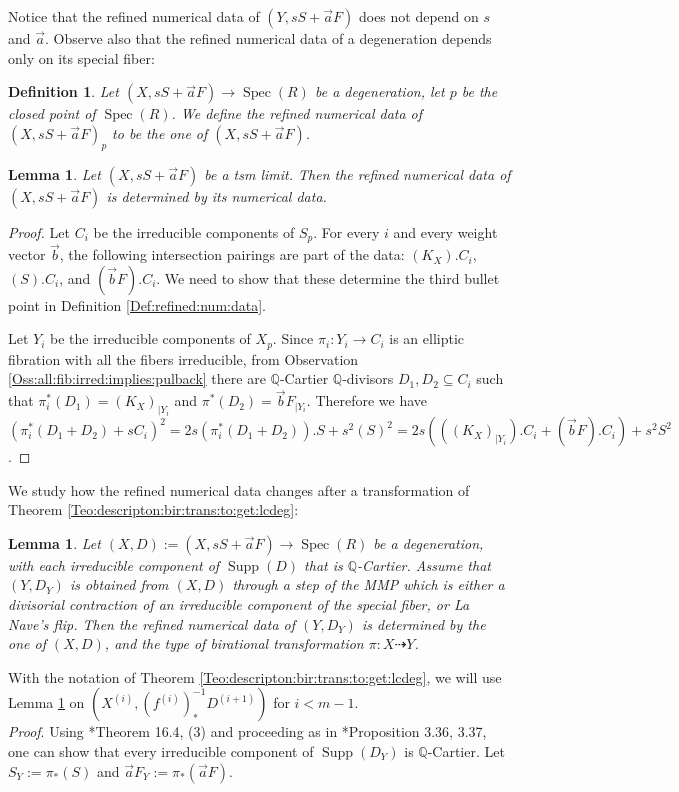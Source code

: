 \documentclass[11pt]{amsart}
\newcommand{\spec}{\operatorname{Spec}}
\newcommand{\supp}{\operatorname{Supp}}
\newtheorem{Def}[theorem]{Definition}
\newtheorem{Lemma}[theorem]{Lemma}
\theoremstyle{definition}
\begin{document}
Notice that the refined numerical data of $(Y,sS+\vec{a}F)$ does not depend on $s$ and $\vec{a}$. 
 Observe also that
the refined numerical data of a degeneration depends only on its special fiber:
\begin{Def}\label{Def:num:data:special:fiber}
 Let $(X,sS+\vec{a}F) \to \spec(R)$ be a degeneration, let $p$ be the closed point of $\spec(R)$.
 We define the refined numerical
 data of $(X,sS+\vec{a}F)_p$ to be the one of $(X,sS+\vec{a}F)$.
\end{Def}
\begin{Lemma}\label{Lemma:numerical:data:gives:rnum:data} Let $(X,sS+\vec{a}F)$ be a tsm limit. Then the refined numerical data of $(X,sS+\vec{a}F)$
is determined by its numerical data. \end{Lemma}
\begin{proof} Let $C_i$ be the irreducible components of $S_p$.
For every $i$ and every weight vector $\vec{b}$, the following intersection pairings are part of the data:
 $(K_{X}).C_i$,
  $(S).C_i$, and
  $(\vec{b}F).C_i$. We need to show that these determine the third bullet point in Definition \ref{Def:refined:num:data}.

Let $Y_i$ be the irreducible components of $X_p$.
Since $\pi_i:Y_i \to C_i$ is an
elliptic fibration with all the fibers irreducible, from Observation \ref{Oss:all:fib:irred:implies:pulback} there are $\mathbb{Q}$-Cartier $\mathbb{Q}$-divisors $D_1,D_2 \subseteq C_i$ such that
$\pi_i^*(D_1)=(K_{X})_{|Y_i}$ and $\pi^*(D_2)=\vec{b}F_{|Y_i}$.
Therefore we have $(\pi_i^*(D_1+D_2)+sC_i)^2=2s(\pi_i^*(D_1+D_2)).S +s^2(S)^2=2s(((K_{X})_{|Y_i}).C_i+(\vec{b}F).C_i)+s^2S^2$.\end{proof}
We study how the refined numerical data changes after a transformation of Theorem \ref{Teo:descripton:bir:trans:to:get:lcdeg}:
\begin{Lemma}\label{Lemma:recovering:refined:numerical:data}
 Let $(X,D):=(X,sS+\vec{a}F) \to \spec(R)$ be a degeneration, with each irreducible component of $\supp(D)$
 that is $\mathbb{Q}$-Cartier.
 Assume that $(Y,D_Y)$ is obtained from $(X,D)$ through a step of the MMP
which is either a divisorial contraction of an irreducible component of the special fiber, or La Nave's flip.
Then the refined numerical data of $(Y,D_Y)$
is determined by the one of $(X,D)$, and the type of birational transformation
$\pi:X\dashrightarrow Y$.
\end{Lemma}
With the notation of Theorem \ref{Teo:descripton:bir:trans:to:get:lcdeg}, we will use Lemma \ref{Lemma:recovering:refined:numerical:data} on $(X^{(i)},(f^{(i)})^{-1}_*D^{(i+1)})$ for $i<m-1$.\\
\emph{Proof}.
Using \cite{Fuj-contraction}*{Theorem 16.4, (3)} and proceeding as in \cite{KM}*{Proposition 3.36, 3.37},
 one can show that every irreducible component of $\supp(D_Y)$
 is $\mathbb{Q}$-Cartier. Let $S_Y:=\pi_*(S)$ and $\vec{a}F_Y:=\pi_*(\vec{a}F)$. 
 
\end{document}
